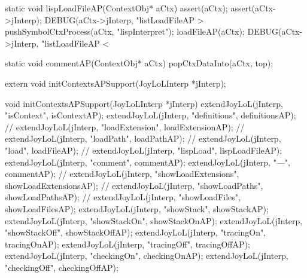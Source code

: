\startCCode
static void lispLoadFileAP(ContextObj* aCtx) {
  assert(aCtx);
  assert(aCtx->jInterp);
  DEBUG(aCtx->jInterp, "listLoadFileAP > %
  pushSymbolCtxProcess(aCtx, "lispInterpret");
  loadFileAP(aCtx);
  DEBUG(aCtx->jInterp, "listLoadFileAP < %
}
\stopCCode

\startCCode
static void commentAP(ContextObj* aCtx) {
  popCtxDataInto(aCtx, top);
}
\stopCCode

\startCHeader
extern void initContextsAPSupport(JoyLoLInterp *jInterp);
\stopCHeader
{}

\startCCode
void initContextsAPSupport(JoyLoLInterp *jInterp) {
  extendJoyLoL(jInterp, "isContext",           isContextAP);
  extendJoyLoL(jInterp, "definitions",         definitionsAP);
//  extendJoyLoL(jInterp, "loadExtension",       loadExtensionAP);
//  extendJoyLoL(jInterp, "loadPath",            loadPathAP);
//  extendJoyLoL(jInterp, "load",                loadFileAP);
//  extendJoyLoL(jInterp, "lispLoad",            lispLoadFileAP);
  extendJoyLoL(jInterp, "comment",             commentAP);
  extendJoyLoL(jInterp, "---",                 commentAP);
//  extendJoyLoL(jInterp, "showLoadExtensions",  showLoadExtensionsAP);
//  extendJoyLoL(jInterp, "showLoadPaths",       showLoadPathsAP);
//  extendJoyLoL(jInterp, "showLoadFiles",       showLoadFilesAP);
  extendJoyLoL(jInterp, "showStack",           showStackAP);
  extendJoyLoL(jInterp, "showStackOn",         showStackOnAP);
  extendJoyLoL(jInterp, "showStackOff",        showStackOffAP);
  extendJoyLoL(jInterp, "tracingOn",           tracingOnAP);
  extendJoyLoL(jInterp, "tracingOff",          tracingOffAP);
  extendJoyLoL(jInterp, "checkingOn",          checkingOnAP);
  extendJoyLoL(jInterp, "checkingOff",         checkingOffAP);
}
\stopCCode